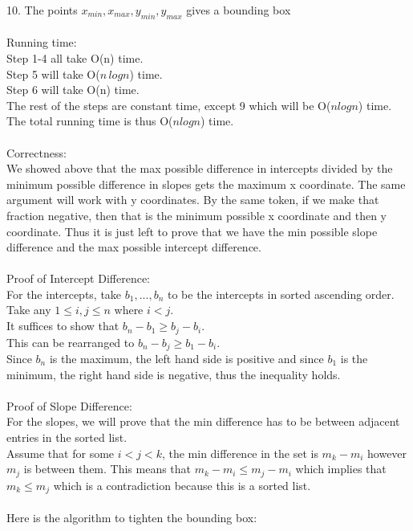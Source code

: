 \documentclass[11pt,psfig]{article}
\begin{document}
10. The points $x_{min},x_{max},y_{min},y_{max}$ gives a bounding box\\
\\
Running time:\\
Step 1-4 all take O(n) time.\\
Step 5 will take O($n \, log n$) time. \\
Step 6 will take O(n) time. \\
The rest of the steps are constant time, except 9 which will be O($n log n$) time. \\
The total running time is thus O($n log n$) time. \\
\\
Correctness:\\
We showed above that the max possible difference in intercepts divided by the minimum possible difference in slopes gets the maximum x coordinate. The same argument will work with y coordinates. By the same token, if we make that fraction negative, then that is the minimum possible x coordinate and then y coordinate. Thus it is just left to prove that we have the min possible slope difference and the max possible intercept difference. \\
\\
Proof of Intercept Difference: \\
For the intercepts, take $b_1,...,b_n$ to be the intercepts in sorted ascending order. \\Take any $1 \leq i,j \leq n$ where $i < j$. \\It suffices to show that $b_n - b_1 \geq b_j - b_i$. \\
This can be rearranged to $b_n-b_j \geq b_1-b_i$. \\
Since $b_n$ is the maximum, the left hand side is positive and since $b_1$ is the minimum, the right hand side is negative, thus the inequality holds. \\
\\
Proof of Slope Difference: \\
For the slopes, we will prove that the min difference has to be between adjacent entries in the sorted list. \\
Assume that for some $i < j < k$, the min difference in the set is $m_k-m_i$ however $m_j$ is between them. This means that $m_k-m_i \leq m_j-m_i$ which implies that $m_k \leq m_j$ which is a contradiction because this is a sorted list. \\
\\
Here is the algorithm to tighten the bounding box:\\
\end{document}
